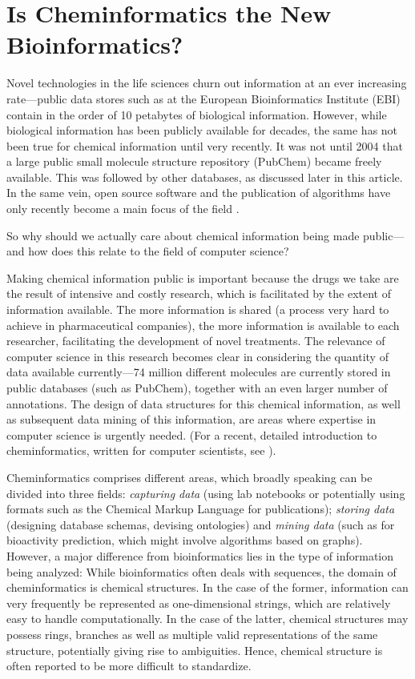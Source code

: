 \documentclass{sig-alternate}
\begin{document}
\section{Is Cheminformatics the New \\Bioinformatics?}

Novel technologies in the life sciences churn out information at an ever
increasing rate---public data stores such as at the European Bioinformatics
Institute (EBI) contain in the order of 10 petabytes of biological information.
However, while biological information has been publicly available for decades,
the same has not been true for chemical information until very recently. It was
not until 2004 that a large public small molecule structure repository (PubChem)
became freely available. This was followed by other databases, as discussed later
in this article. In the same vein, open source software and the publication of
algorithms have only recently become a main focus of the field
\cite{faulon2010}.

So why should we actually care about chemical information being made
public---and how does this relate to the field of computer science?

Making chemical information public is important because the
drugs we take are the result of intensive and costly research, 
which is facilitated by the extent of information available. The
more information is shared (a process very hard to achieve
in pharmaceutical companies), the more information is available to each 
researcher, facilitating the development of
novel treatments. The relevance of computer
science in this research becomes clear in considering the quantity of data available
currently---74 million different molecules are currently stored in
public databases (such as PubChem), together with an even larger number of annotations.
The design of data structures for this chemical information, as well as subsequent
data mining of this information, are areas where expertise in computer
science is urgently needed. (For a recent, detailed introduction to
cheminformatics, written for computer scientists, see
\cite{brown2009}).

Cheminformatics comprises different areas, which broadly speaking can be divided
into three fields: \emph{capturing data} (using lab notebooks or potentially using
formats such as the Chemical Markup Language for publications); \emph{storing data}
(designing database schemas, devising ontologies) and \emph{mining data} (such as for
bioactivity prediction, which might involve algorithms based on graphs).
However, a major difference from bioinformatics lies in the type of
information being analyzed: While bioinformatics often deals with sequences, the
domain of cheminformatics is chemical structures. In the case of the former,
information can very frequently be represented as one-dimensional strings, which
are relatively easy to handle computationally. In the case of the latter, chemical
structures may possess rings, branches as well as multiple valid representations
of the same structure, potentially giving rise to ambiguities. Hence,
chemical structure is often reported to be more difficult to standardize. 
\end{document}
